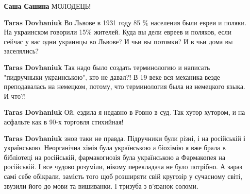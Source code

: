 \begin{itemize}
\begin{itemize}
 
\textbf{Саша Сашина} МОЛОДЕЦЬ!

 
\textbf{Taras Dovhaniuk} Во Львове в 1931 году 85 \% населения были евреи и
поляки. На украинском говорили 15\% жителей. Куда вы дели евреев и поляков, если
сейчас у вас одни украинцы во Львове? И чьи вы потомки? И в чьи дома вы
заселялись?

 
\textbf{Taras Dovhaniuk} Так надо было создать терминологию и написать
"пидручныки украинською", кто не давал?! В 19 веке вся механика везде
преподавалась на немецком, потому, что терминология была из немецкого языка. И
что?!

 
\textbf{Taras Dovhaniuk} Ой, ездила я недавно в Ровно в суд. Так хутор хутором, и на асфальте как в 90-х торговля стихийная!

 
\textbf{Taras Dovhaniuk} знов таки не правда. Підручники були різні, і на
російській і українською. Неорганічна хімія була українською а біохімію я вже
брала в бібліотеці на російській, фармакогнозія була українською а Фармакопея
на російській. І все чудово розуміли, нікому перекладача не було потрібно. А
зараз самі себе обікрали, замість того щоб розширяти свій кругозір у сучасному
світі, звузили його до мови та вишиванки. І тризуба з в'язанок соломи.


\end{itemize}
\end{itemize}
